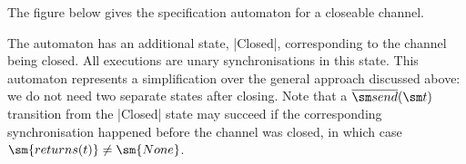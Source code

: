 The figure below gives the specification automaton for a closeable channel.
%
\begin{center}
\end{center}
%
The automaton has an additional state, |Closed|,
corresponding to the channel being closed.  All executions are unary
synchronisations in this state.  This automaton represents a simplification
over the general approach discussed above: we do not need two separate states
after closing.  Note that a $\overline{\send}(\sm t)$ transition from the
|Closed| state may succeed if the corresponding synchronisation happened
before the channel was closed, in which case $\sm{returns(t)} \ne \sm{None}$.
